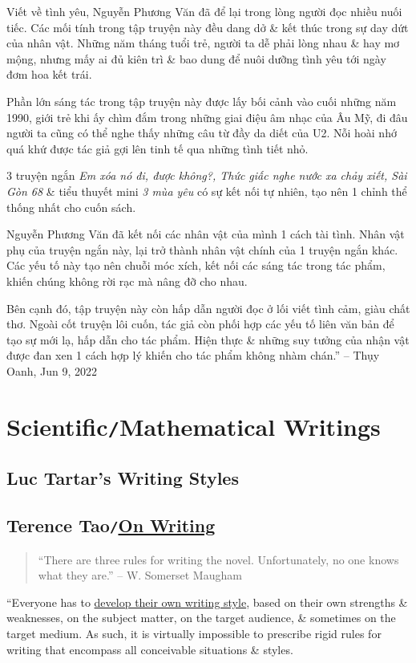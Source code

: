 \documentclass[oneside]{book}
\numberwithin{equation}{section}
\begin{document}
Viết về tình yêu, Nguyễn Phương Văn đã để lại trong lòng người đọc nhiều nuối tiếc. Các mối tính trong tập truyện này đều dang dở \& kết thúc trong sự day dứt của nhân vật. Những năm tháng tuổi trẻ, người ta dễ phải lòng nhau \& hay mơ mộng, nhưng mấy ai đủ kiên trì \& bao dung để nuôi dưỡng tình yêu tới ngày đơm hoa kết trái.

Phần lớn sáng tác trong tập truyện này được lấy bối cảnh vào cuối những năm 1990, giới trẻ khi ấy chìm đắm trong những giai điệu âm nhạc của Âu Mỹ, đi đâu người ta cũng có thể nghe thấy những câu từ đầy da diết của U2. Nỗi hoài nhớ quá khứ được tác giả gợi lên tinh tế qua những tình tiết nhỏ.

3 truyện ngắn \textit{Em xóa nó đi, được không?, Thức giấc nghe nước xa chảy xiết, Sài Gòn 68} \& tiểu thuyết mini \textit{3 mùa yêu} có sự kết nối tự nhiên, tạo nên 1 chỉnh thể thống nhất cho cuốn sách.

Nguyễn Phương Văn đã kết nối các nhân vật của mình 1 cách tài tình. Nhân vật phụ của truyện ngắn này, lại trở thành nhân vật chính của 1 truyện ngắn khác. Các yếu tố này tạo nên chuỗi móc xích, kết nối các sáng tác trong tác phẩm, khiến chúng không rời rạc mà nâng đỡ cho nhau.

Bên cạnh đó, tập truyện này còn hấp dẫn người đọc ở lối viết tình cảm, giàu chất thơ. Ngoài cốt truyện lôi cuốn, tác giả còn phối hợp các yếu tố liên văn bản để tạo sự mới lạ, hấp dẫn cho tác phẩm. Hiện thực \& những suy tưởng của nhận vật được đan xen 1 cách hợp lý khiến cho tác phẩm không nhàm chán.'' -- Thụy Oanh, Jun 9, 2022


\part{Scientific\texttt{/}Mathematical Writings}

\chapter{Luc Tartar's Writing Styles}


\chapter{Terence Tao\texttt{/}\href{https://terrytao.wordpress.com/advice-on-writing-papers/}{On Writing}}
\begin{quotation}
	``There are three rules for writing the novel. Unfortunately, no one knows what they are.'' -- W. Somerset Maugham
\end{quotation}
``Everyone has to \href{https://terrytao.wordpress.com/advice-on-writing-papers/write-in-your-own-voice/}{develop their own writing style}, based on their own strengths \& weaknesses, on the subject matter, on the target audience, \& sometimes on the target medium. As such, it is virtually impossible to prescribe rigid rules for writing that encompass all conceivable situations \& styles.
\end{document}

